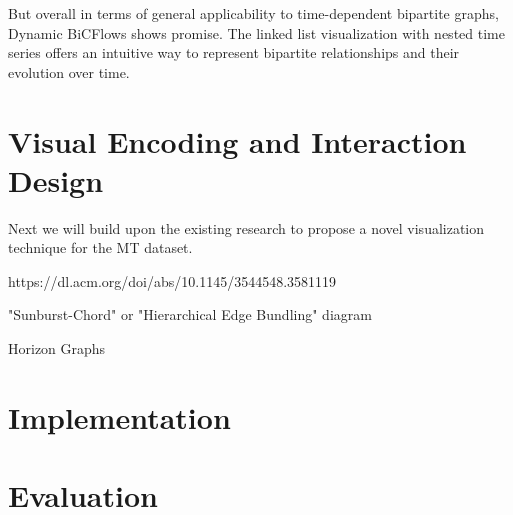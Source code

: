 \documentclass{vgtc}
\begin{document}
But overall in terms of general applicability to time-dependent bipartite graphs, Dynamic BiCFlows shows promise. The linked list visualization with nested time series offers an intuitive way to represent bipartite relationships and their evolution over time.

\section{Visual Encoding and Interaction Design} %

Next we will build upon the existing research to propose a novel visualization technique for the MT dataset.



https://dl.acm.org/doi/abs/10.1145/3544548.3581119

"Sunburst-Chord" or "Hierarchical Edge Bundling" diagram

Horizon Graphs

\section{Implementation} %

\section{Evaluation} %








% 

% 
% 
% 


\end{document}
